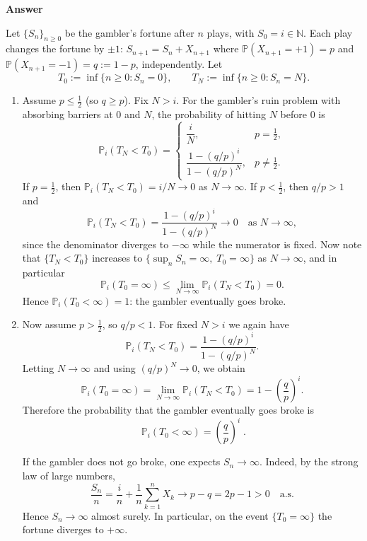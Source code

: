 \documentclass[letterpaper]{article}
\begin{document}
		\textbf{Answer}
		
		Let $\{S_n\}_{n\ge 0}$ be the gambler's fortune after $n$ plays, with $S_0=i\in\mathbb{N}$.
		Each play changes the fortune by $\pm 1$:
		$S_{n+1}=S_n+X_{n+1}$ where $\mathbb{P}(X_{n+1}=+1)=p$ and $\mathbb{P}(X_{n+1}=-1)=q:=1-p$,
		independently. Let
		\[
		T_0:=\inf\{n\ge 0:S_n=0\},\qquad
		T_N:=\inf\{n\ge 0:S_n=N\}.
		\]
		
		\begin{enumerate}
			\item[(a)] Assume $p\le \tfrac12$ (so $q\ge p$). Fix $N>i$.
			For the gambler's ruin problem with absorbing barriers at $0$ and $N$,
			the probability of hitting $N$ before $0$ is
			\[
			\mathbb{P}_i(T_N<T_0)=
			\begin{cases}
				\dfrac{i}{N}, & p=\tfrac12,\\[8pt]
				\dfrac{1-(q/p)^i}{1-(q/p)^N}, & p\neq\tfrac12.
			\end{cases}
			\]
			If $p=\tfrac12$, then $\mathbb{P}_i(T_N<T_0)=i/N\to 0$ as $N\to\infty$.
			If $p<\tfrac12$, then $q/p>1$ and
			\[
			\mathbb{P}_i(T_N<T_0)=\frac{1-(q/p)^i}{1-(q/p)^N}\to 0
			\quad\text{as }N\to\infty,
			\]
			since the denominator diverges to $-\infty$ while the numerator is fixed.
			Now note that $\{T_N<T_0\}$ increases to $\{\sup_n S_n=\infty,\; T_0=\infty\}$ as $N\to\infty$,
			and in particular
			\[
			\mathbb{P}_i(T_0=\infty)\le \lim_{N\to\infty}\mathbb{P}_i(T_N<T_0)=0.
			\]
			Hence $\mathbb{P}_i(T_0<\infty)=1$: the gambler eventually goes broke.
			
			\item[(b)] Now assume $p>\tfrac12$, so $q/p<1$. For fixed $N>i$ we again have
			\[
			\mathbb{P}_i(T_N<T_0)=\frac{1-(q/p)^i}{1-(q/p)^N}.
			\]
			Letting $N\to\infty$ and using $(q/p)^N\to 0$, we obtain
			\[
			\mathbb{P}_i(T_0=\infty)
			=\lim_{N\to\infty}\mathbb{P}_i(T_N<T_0)
			=1-\left(\frac{q}{p}\right)^i.
			\]
			Therefore the probability that the gambler eventually goes broke is
			\[
			{\;\mathbb{P}_i(T_0<\infty)=\left(\frac{q}{p}\right)^i\; }.
			\]
			
			If the gambler does not go broke, one expects $S_n\to\infty$.
			Indeed, by the strong law of large numbers,
			\[
			\frac{S_n}{n}=\frac{i}{n}+\frac{1}{n}\sum_{k=1}^n X_k \to p-q=2p-1>0
			\quad\text{a.s.}
			\]
			Hence $S_n\to\infty$ almost surely. In particular, on the event $\{T_0=\infty\}$ the
			fortune diverges to $+\infty$.
		\end{enumerate}
		
		
		\clearpage
		
		
		
		
		
		
		
		
	
\end{document}
